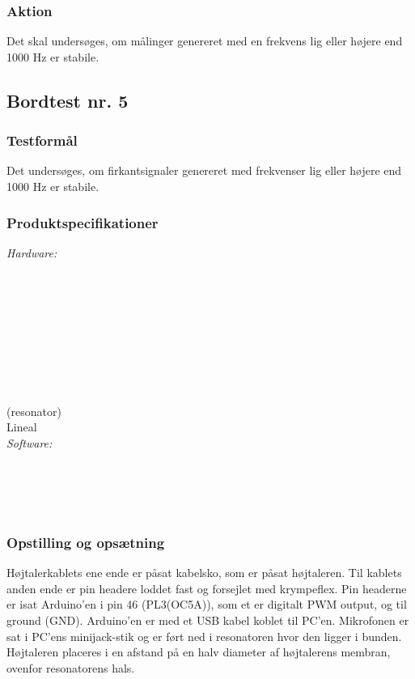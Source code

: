 			\subsubsection{Aktion}
			Det skal undersøges, om målinger genereret med en frekvens lig eller højere end 1000 Hz er stabile. 
			
			\subsection{Bordtest nr. 5} %
		\subsubsection{Testformål}
		Det undersøges, om firkantsignaler genereret med frekvenser lig eller højere end 1000 Hz er stabile. 
		
		\subsubsection{Produktspecifikationer}
		
		\textit{Hardware:}\\
		\tores\\
		\\
		\kabelsko\\
		\pins\\
		\krympeflex\\
		\arduino\\
		\mikrofon\\
		\PC\\
		\usbkabel\\
		 (resonator)\\
		Lineal\\
	
		\textit{Software:}\\
		\labview\\
		\visa\\
		\vi\\
		\ardsw\\
		
		
		\subsubsection{Opstilling og opsætning}
		
		Højtalerkablets ene ende er påsat kabelsko, som er påsat højtaleren. Til kablets anden ende er pin headere loddet fast og forsejlet med krympeflex. Pin headerne er isat Arduino'en i pin 46 (PL3(OC5A)), som et er digitalt PWM output, og til ground (GND). 
		Arduino'en er med et USB kabel koblet til PC'en.	
		Mikrofonen er sat i PC'ens minijack-stik og er ført ned i resonatoren hvor den ligger i bunden. Højtaleren placeres i en afstand på en halv diameter af højtalerens membran, ovenfor resonatorens hals. 
		
